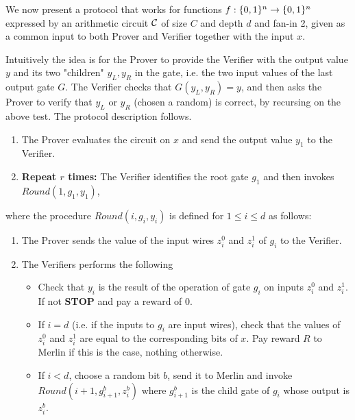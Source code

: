 We now present a protocol that works for functions $f: \{0, 1\}^n \to \{0, 1\}^n$ expressed by an arithmetic circuit $\cal C$ of size $C$ and depth $d$ and fan-in 2, given as a common input to both Prover and Verifier together with the input $x$. 

Intuitively the idea is for the Prover to provide the Verifier with the output value $y$ and its two "children" $y_L,y_R$ in the gate, i.e. the two input values of the last output gate $G$. The Verifier checks that $G(y_L,y_R)=y$, and then asks the Prover to verify that $y_L$ or $y_R$ (chosen a random) is correct, by 
recursing on the above test. The protocol description follows. 


\begin{framed}
\begin{enumerate}
\item The Prover evaluates the circuit on $x$ and send the output value $y_1$ to the
Verifier. 

\item {\bf Repeat $r$ times:} The Verifier identifies the root gate $g_1$ and 
then invokes $Round(1,g_1, y_1)$,
\end{enumerate}
where the procedure $Round(i, g_i, y_i)$ is defined for $1 \leq i \leq d$ as 
follows:
\begin{enumerate}
\item The Prover sends the value of the input wires $z^0_i$ and $z^1_i$ of $g_i$ to the Verifier.  

\item The Verifiers performs the following 
\begin{itemize}
\item Check that $y_i$ is the result of the operation of gate $g_i$ on inputs 
$z^0_i$ and $z^1_i$. If not \textbf{STOP} and pay a reward of $0$.
\item If $i = d$ (i.e. if the inputs to $g_i$ are input wires), check that 
the values of $z^0_i$ and $z^1_i$ are equal to the corresponding bits of $x$. Pay
reward $R$ to Merlin if this is the case, nothing otherwise.
\item If $i < d$, choose a random bit $b$, send it to Merlin and invoke 
$Round(i+1, g^b_{i+1}, z^b_i)$ where $g^b_{i+1}$ is the child gate of $g_i$ whose output is
$z^b_{i}$.
\end{itemize}
\end{enumerate}
\end{framed}

